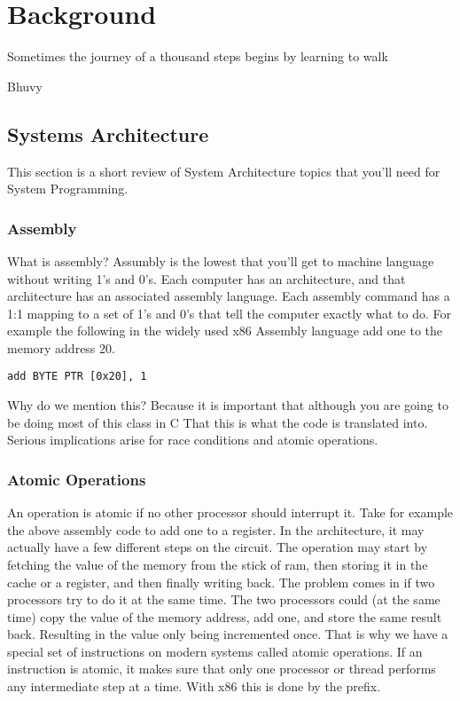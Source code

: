 \chapter{Background}

\epigraph{Sometimes the journey of a thousand steps begins by learning to walk}{Bhuvy}

\section{Systems Architecture}

This section is a short review of System Architecture topics that you'll need for System Programming.

\subsection{Assembly}

What is assembly? Assumbly is the lowest that you'll get to machine language without writing 1's and 0's.
Each computer has an architecture, and that architecture has an associated assembly language.
Each assembly command has a 1:1 mapping to a set of 1's and 0's that tell the computer exactly what to do.
For example the following in the widely used x86 Assembly language add one to the memory address 20.

\begin{verbatim}
add BYTE PTR [0x20], 1
\end{verbatim}

Why do we mention this? Because it is important that although you are going to be doing most of this class in C
That this is what the code is translated into.
Serious implications arise for race conditions and atomic operations.

\subsection{Atomic Operations}

An operation is atomic if no other processor should interrupt it. Take for example the above assembly code to add one to a register.
In the architecture, it may actually have a few different steps on the circuit.
The operation may start by fetching the value of the memory from the stick of ram, then storing it in the cache or a register, and then finally writing back.
The problem comes in if two processors try to do it at the same time.
The two processors could (at the same time) copy the value of the memory address, add one, and store the same result back.
Resulting in the value only being incremented once.
That is why we have a special set of instructions on modern systems called atomic operations.
If an instruction is atomic, it makes sure that only one processor or thread performs any intermediate step at a time.
With x86 this is done by the  prefix.

